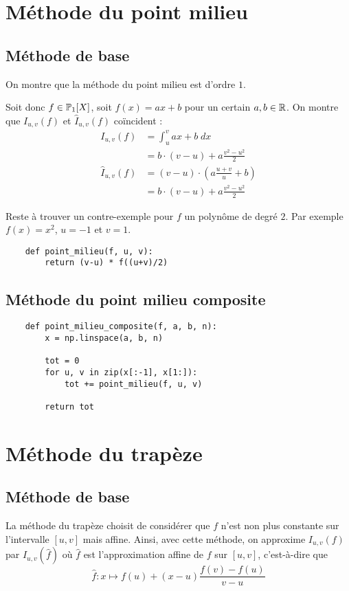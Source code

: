 \section{Méthode du point milieu}
\subsection{Méthode de base}

\quessques On montre que la méthode du point milieu est d'ordre $ 1 $.

Soit donc $ f \in \P_1[X] $, soit $ f(x) = ax + b $ pour un certain $ a, b \in \R $. On montre que $ I_{u, v}(f) $ et $ \hat{I}_{u, v}(f) $ coïncident :
\begin{align*}
    I_{u, v}(f) &= \int_{u}^{v} ax + b \; dx\\
                &= b \cdot (v-u) + a \frac{v^2 - u^2}{2}\\
    \hat{I}_{u, v}(f) &= (v-u) \cdot (a \frac{u+v}{u} + b)\\
                      &= b \cdot (v-u) + a \frac{v^2-u^2}{2}
\end{align*}

Reste à trouver un contre-exemple pour $ f $ un polynôme de degré $ 2 $. Par exemple $ f(x) = x^2 $, $ u=-1 $ et $ v=1 $.

\ssques 

\begin{verbatim}
    def point_milieu(f, u, v):
        return (v-u) * f((u+v)/2)
\end{verbatim}

\subsection{Méthode du point milieu composite}

\quessques 

\begin{verbatim}
    def point_milieu_composite(f, a, b, n):
        x = np.linspace(a, b, n)

        tot = 0
        for u, v in zip(x[:-1], x[1:]):
            tot += point_milieu(f, u, v)

        return tot
\end{verbatim}


\section{Méthode du trapèze}
\subsection{Méthode de base}
La méthode du trapèze choisit de considérer que $ f $ n'est non plus constante sur l'intervalle $ [u, v] $ mais affine. Ainsi, avec cette méthode, on approxime $ I_{u,v}(f) $ par $ I_{u,v}(\hat{f}) $ où $ \hat{f} $ est l'approximation affine de $ f $ sur $ [u, v] $, c'est-à-dire que \[
    \hat{f} : x \mapsto f(u) + (x-u) \frac{f(v)-f(u)}{v-u}
\]

